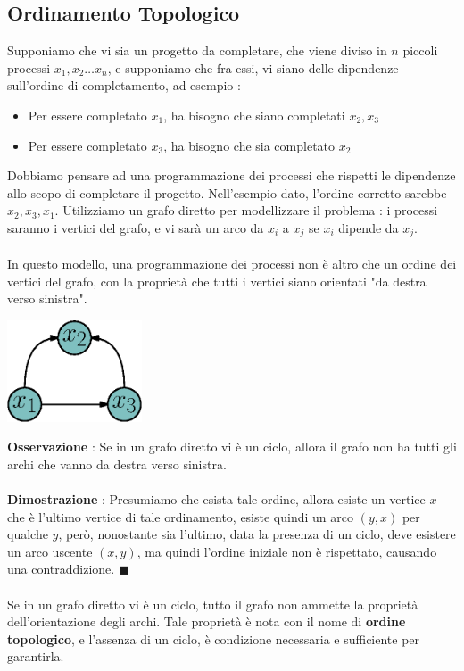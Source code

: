 \documentclass[12pt, letterpaper]{article}
\newcommand{\acc}{\\\hphantom{}\\}
\begin{document}
\subsection{Ordinamento Topologico}
Supponiamo che vi sia un progetto da completare, che viene diviso in \(n\) piccoli processi 
\(x_1,x_2\dots x_n\), e supponiamo che fra essi, vi siano delle dipendenze sull'ordine di completamento, ad 
esempio : \begin{itemize}
    \item Per essere completato \(x_1\), ha bisogno che siano completati \(x_2,x_3\)
    \item Per essere completato \(x_3\), ha bisogno che sia completato \(x_2\)
\end{itemize}
Dobbiamo pensare ad una programmazione dei processi che rispetti le dipendenze allo scopo di completare il progetto.
Nell'esempio dato, l'ordine corretto sarebbe \(x_2,x_3,x_1\). Utilizziamo un grafo diretto per modellizzare il 
problema : i processi saranno i vertici del grafo, e vi sarà un arco da \(x_i\) a \(x_j\) se \(x_i\) dipende 
da \(x_j\).\acc In questo modello, una programmazione dei processi non è altro che un ordine dei vertici 
del grafo, con la proprietà che tutti i vertici siano orientati "da destra verso sinistra".\begin{center}
    \includegraphics[width=0.3\textwidth ]{images/processiGrafo.eps}
\end{center}
\textbf{Osservazione} : Se in un grafo diretto vi è un ciclo, allora il grafo non ha tutti gli archi che vanno 
da destra verso sinistra. \acc 
\textbf{Dimostrazione} : Presumiamo che esista tale ordine, allora esiste un vertice \(x\) che è l'ultimo vertice 
di tale ordinamento, esiste quindi un arco \((y,x)\) per qualche \(y\), però, nonostante sia l'ultimo, 
data la presenza di un ciclo, deve esistere un arco uscente \((x,y)\), ma quindi l'ordine iniziale non è rispettato, 
causando una contraddizione. \(\blacksquare\)\acc 
Se in un grafo diretto vi è un ciclo, tutto il grafo non ammette la proprietà dell'orientazione degli archi. Tale 
proprietà è nota con il nome di \textbf{ordine topologico}, e l'assenza di un ciclo, è condizione necessaria 
e sufficiente per garantirla.\acc 
\end{document}
